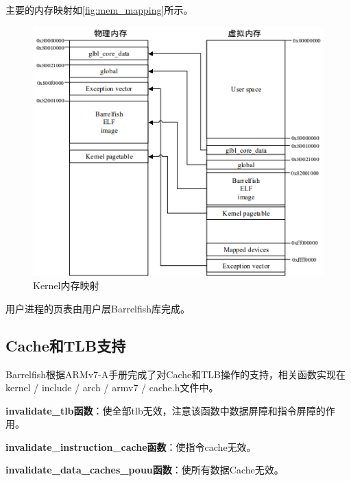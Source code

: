 \documentclass[a4paper, 12pt]{report}
\begin{document}
    主要的内存映射如\autoref{fig:mem_mapping}所示。
    
    \begin{figure}[htbp]
        \centering
        \includegraphics{./image/mem_mapping.png}
        \caption{Kernel内存映射}
        \label{fig:mem_mapping}
    \end{figure}
    
    用户进程的页表由用户层Barrelfish库完成。
    
    \subsection{Cache和TLB支持}
    
    Barrelfish根据ARMv7-A手册完成了对Cache和TLB操作的支持，相关函数实现在kernel / include / arch / armv7 / cache.h文件中。
    
    \textbf{invalidate\_tlb函数}：使全部tlb无效，注意该函数中数据屏障和指令屏障的作用。
    
    \textbf{invalidate\_instruction\_cache函数}：使指令cache无效。
    
    \textbf{invalidate\_data\_caches\_pouu函数}：使所有数据Cache无效。
	
\end{document}
